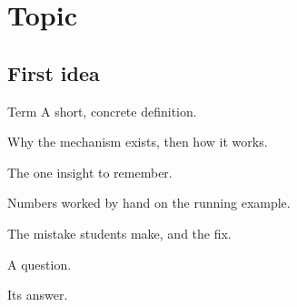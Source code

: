 \chapter{Topic}\label{ch:topic}

\begin{glance}
\end{glance}

\section{First idea}
\begin{definition}{Term}
A short, concrete definition.
\end{definition}
Why the mechanism exists, then how it works.
\begin{keyidea}
The one insight to remember.
\end{keyidea}
\begin{example}
Numbers worked by hand on the running example.
\end{example}
\begin{pitfall}
The mistake students make, and the fix.
\end{pitfall}

\begin{selfcheck}
\item A question.
\end{selfcheck}
\begin{answers}
\item Its answer.
\end{answers}
